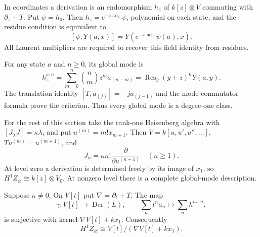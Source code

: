 In coordinates a derivation
is an endomorphism $h_z$
of $k[z]\otimes V$
commuting with $\partial_z+T$.
Put $\psi=h_0$. Then
$h_z=e^{-z\operatorname{ad}_T}\psi$,
polynomial on each state,
and the residue condition
is equivalent to
\[
 [\psi,Y(a,x)]
 =Y(e^{-x\operatorname{ad}_T}\psi(a),x).
\]
All Laurent multipliers
are required to recover
this field identity
from residues.

For any state $a$ and
$n\geq0$, its global
mode is
\begin{equation}\label{v4-arith:centers:eq:global-mode}
 h_z^{a,n}
 =\sum_{m=0}^n\binom nm z^m a_{(n-m)}
 =\operatorname{Res}_y(y+z)^nY(a,y).
\end{equation}
The translation identity
$[T,a_{(j)}]=-ja_{(j-1)}$
and the mode commutator
formula prove the
criterion. Thus every
global mode is a
degree-one class.

For the rest of this
section take the rank-one
Heisenberg algebra with
$[J_\lambda J]=\kappa\lambda$,
and put $u^{(m)}=m!x_{m+1}$.
Then
$V=k[u,u',u'',\ldots]$,
$Tu^{(m)}=u^{(m+1)}$, and
\[
 J_n=\kappa n!
       \frac{\partial}{\partial u^{(n-1)}}\quad(n\geq1).
\]
At level zero a derivation
is determined freely by
its image of $x_1$, so
$H^1Z_\varnothing\cong k[z]\otimes V_0$.
At nonzero level there
is a complete global-mode
description.

\begin{theorem}\label{v4-arith:centers:thm:global-modes}
Suppose $\kappa\ne0$.
On $V[t]$ put
$\nabla=\partial_t+T$.
The map
\[
 \gamma:V[t]\longrightarrow\operatorname{Der}(L),
 \qquad
 \sum_nt^na_n\longmapsto\sum_nh^{a_n,n},
\]
is surjective with
kernel $\nabla V[t]+kx_1$.
Consequently
\[
 H^1Z_\varnothing
 \cong V[t]/(\nabla V[t]+kx_1).
\]
\end{theorem}

